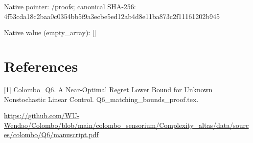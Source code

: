 \documentclass[10pt,a4paper]{article}
\begin{document}
Native pointer: /proofs; canonical SHA-256: 4f53cda18c2baa0c0354bb5f\allowbreak{}9a3ecbe5ed12ab4d8e11ba87\allowbreak{}3c2f11161202b945



Native value (empty\_array): []



\section{References}


[1] Colombo\_Q6. A Near-Optimal Regret Lower Bound for Unknown Nonstochastic Linear Control. Q6\_matching\_bounds\_proof.tex.



\url{https://github.com/WU-Wendao/Colombo/blob/main/colombo_sensorium/Complexity_altas/data/sources/colombo/Q6/manuscript.pdf}
\end{document}

